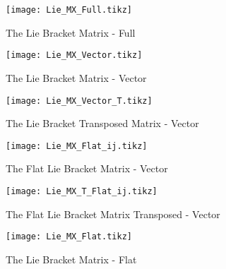 \documentclass[11 pt]{article}
\begin{document}
	\begin{figure}
        \centering
            \texttt{[image: Lie\_MX\_Full.tikz]} %
            \label{fig:pic} %
            \caption{\footnotesize The Lie Bracket Matrix - Full} %
    \end{figure}
    
    \begin{figure}
        \centering
            \texttt{[image: Lie\_MX\_Vector.tikz]} %
            \label{fig:pic} %
                \caption{\footnotesize The Lie Bracket Matrix - Vector} %
    \end{figure}
    
    \begin{figure}
        \centering
            \texttt{[image: Lie\_MX\_Vector\_T.tikz]} %
            \label{fig:pic} %
                \caption{\footnotesize The Lie Bracket Transposed Matrix - Vector} %
    \end{figure}
    
    \begin{figure}
        \centering
            \texttt{[image: Lie\_MX\_Flat\_ij.tikz]} %
            \label{fig:pic} %
                \caption{\footnotesize The Flat Lie Bracket Matrix - Vector} %
    \end{figure}
    
        \begin{figure}
        \centering
            \texttt{[image: Lie\_MX\_T\_Flat\_ij.tikz]} %
            \label{fig:pic} %
                \caption{\footnotesize The Flat Lie Bracket Matrix Transposed - Vector} %
    \end{figure}
    
    \begin{figure}
        \centering
            \texttt{[image: Lie\_MX\_Flat.tikz]} %
            \label{fig:pic} %
                \caption{\footnotesize The Lie Bracket Matrix - Flat} %
    \end{figure}
\end{document}
